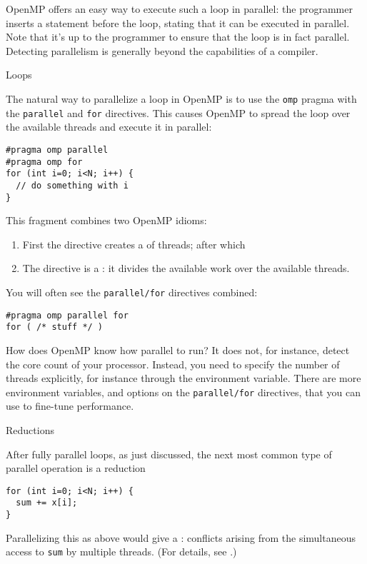 OpenMP offers an easy way to execute such a loop
in parallel: the programmer inserts a statement before the loop,
stating that it can be executed in parallel.
Note that it's up to the programmer to ensure that the
loop is in fact parallel. Detecting parallelism
is generally beyond the capabilities of a compiler.

 {Loops}

The natural way to parallelize a loop in OpenMP
is to use the \lstinline{omp} pragma
with the \lstinline{parallel} and \lstinline{for} directives.
This causes OpenMP to spread the loop over the available threads
and execute it in parallel:
\begin{lstlisting}
#pragma omp parallel
#pragma omp for
for (int i=0; i<N; i++) {
  // do something with i
}
\end{lstlisting}

This fragment combines two OpenMP idioms:
\begin{enumerate}
\item First the  directive
  creates a  of threads; after which
\item The  directive is a
  :
  it divides the available work over the available threads.
\end{enumerate}

You will often see the \lstinline{parallel/for} directives combined:
\begin{lstlisting}
#pragma omp parallel for
for ( /* stuff */ )
\end{lstlisting}

How does OpenMP know how parallel to run?
It does not, for instance, detect the core count of your processor.
Instead, you need to specify the number of threads explicitly,
for instance through the  environment variable.
There are more environment variables, and options on the
\lstinline{parallel/for} directives, that you can use to fine-tune performance.

 {Reductions}

After fully parallel loops, as just discussed,
the next most common type of parallel operation is a reduction
\begin{lstlisting}
for (int i=0; i<N; i++) {
  sum += x[i];
}
\end{lstlisting}
Parallelizing this as above would give a :
conflicts arising from the simultaneous access to \lstinline{sum}
by multiple threads.
(For details, see .)

